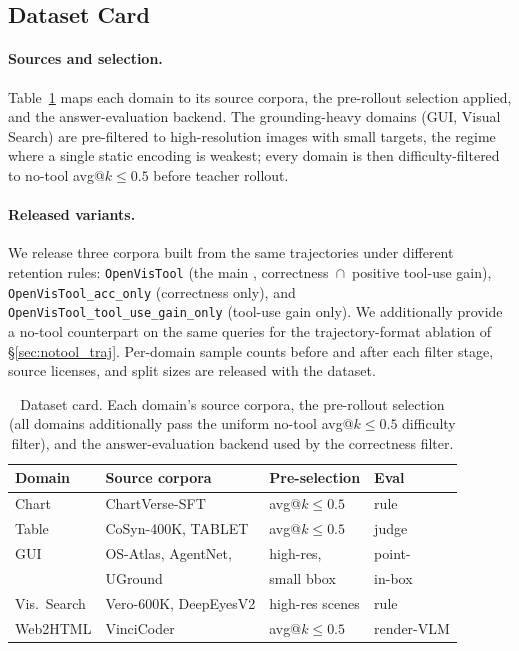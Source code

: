 \subsection{Dataset Card}
\label{app:datacard}

\paragraph{Sources and selection.}
Table~\ref{tab:datacard} maps each domain to its source corpora, the pre-rollout selection applied, and the answer-evaluation backend. The grounding-heavy domains (GUI, Visual Search) are pre-filtered to high-resolution images with small targets, the regime where a single static encoding is weakest; every domain is then difficulty-filtered to no-tool avg@$k\le 0.5$ before teacher rollout.

\paragraph{Released variants.}
We release three corpora built from the same trajectories under different retention rules: \texttt{OpenVisTool} (the main \dataset, correctness~$\cap$~positive tool-use gain), \texttt{OpenVisTool\_acc\_only} (correctness only), and \texttt{OpenVisTool\_tool\_use\_gain\_only} (tool-use gain only). We additionally provide a no-tool counterpart on the same queries for the trajectory-format ablation of \S\ref{sec:notool_traj}. Per-domain sample counts before and after each filter stage, source licenses, and split sizes are released with the dataset. 

\begin{table}[t]
\centering
\small
\setlength{\tabcolsep}{3pt}
\begin{tabular}{llll}
\toprule
Domain & Source corpora & Pre-selection & Eval \\
\midrule
Chart & ChartVerse-SFT & avg@$k\le0.5$ & rule \\
Table & CoSyn-400K, TABLET & avg@$k\le0.5$ & judge \\
GUI & OS-Atlas, AgentNet, & high-res, & point- \\
 & \;UGround & \;small bbox & \;in-box \\
Vis.\ Search & Vero-600K, DeepEyesV2 & high-res scenes & rule \\
Web2HTML & VinciCoder & avg@$k\le0.5$ & render-VLM \\
\bottomrule
\end{tabular}
\caption{Dataset card. Each domain's source corpora, the pre-rollout selection (all domains additionally pass the uniform no-tool avg@$k\le0.5$ difficulty filter), and the answer-evaluation backend used by the correctness filter.}
\label{tab:datacard}
\end{table}

